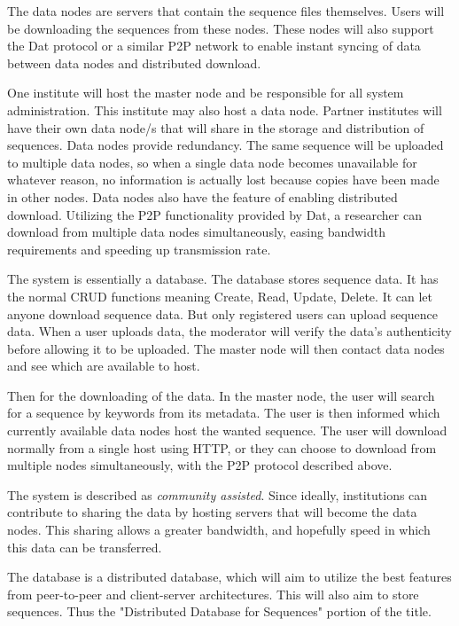 \documentclass[acmsmall]{acmart}
\begin{document}
The data nodes are servers that contain the sequence files themselves. Users will be downloading the sequences from these nodes. These nodes will also support the Dat protocol or a similar P2P network to enable instant syncing of data between data nodes and distributed download.

One institute will host the master node and be responsible for all system administration. This institute may also host a data node. Partner institutes will have their own data node/s that will share in the storage and distribution of sequences. Data nodes provide redundancy. The same sequence will be uploaded to multiple data nodes, so when a single data node becomes unavailable for whatever reason, no information is actually lost because copies have been made in other nodes. Data nodes also have the feature of enabling distributed download. Utilizing the P2P functionality provided by Dat, a researcher can download from multiple data nodes simultaneously, easing bandwidth requirements and speeding up transmission rate.

The system is essentially a database. The database stores sequence data. It has the normal CRUD functions meaning Create, Read, Update, Delete. It can let anyone download sequence data. But only registered users can upload sequence data. When a user uploads data, the moderator will verify the data's authenticity before allowing it to be uploaded. The master node will then contact data nodes and see which are available to host. 

Then for the downloading of the data. In the master node, the user will search for a sequence by keywords from its metadata. The user is then informed which currently available data nodes host the wanted sequence. The user will download normally from a single host using HTTP, or they can choose to download from multiple nodes simultaneously, with the P2P protocol described above.


The system is described as \textit{community assisted}. Since ideally, institutions can contribute to sharing the data by hosting servers that will become the data nodes. This sharing allows a greater bandwidth, and hopefully speed in which this data can be transferred. 

The database is a distributed database, which will aim to utilize the best features from peer-to-peer and client-server architectures. This will also aim to store sequences. Thus the "Distributed Database for Sequences" portion of the title.
\end{document}
